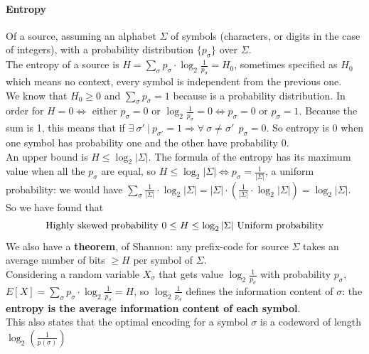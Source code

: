 \documentclass[10pt]{report}
\begin{document}
\paragraph{Entropy} Of a source, assuming an alphabet $\Sigma$ of symbols (characters, or digits in the case of integers), with a probability distribution $\{p_\sigma\}$ over $\Sigma$.\\
The entropy of a source is $H = \sum_\sigma p_\sigma\cdot\log_2 \frac{1}{p_\sigma} = H_0$, sometimes specified as $H_0$ which means no context, every symbol is independent from the previous one.\\
We know that $H_0 \geq 0$ and $\sum_\sigma p_\sigma = 1$ because is a probability distribution. In order for $H = 0 \Leftrightarrow$ either $p_\sigma = 0$ or $\log_2\frac{1}{p_\sigma} = 0 \Leftrightarrow p_\sigma = 0$ or $p_\sigma = 1$. Because the sum is 1, this means that if $\exists\:\sigma'\:|\:p_{\sigma'}=1 \Rightarrow \forall\:\sigma\neq\sigma'\:\:p_\sigma = 0$. So entropy is $0$ when one symbol has probability one and the other have probability $0$.\\
An upper bound is $H \leq \log_2 |\Sigma|$. The formula of the entropy has its maximum value when all the $p_\sigma$ are equal, so $H \leq \log_2 |\Sigma| \Leftrightarrow p_\sigma = \frac{1}{|\Sigma|}$, a uniform probability: we would have $\sum_\sigma \frac{1}{|\Sigma|}\cdot\log_2|\Sigma| = |\Sigma|\cdot\left(\frac{1}{|\Sigma|}\cdot\log_2|\Sigma|\right) = \log_2|\Sigma|$. So we have found that $$\hbox{Highly skewed probability }0 \leq H \leq \log_2 |\Sigma|\hbox{ Uniform probability}$$
We also have a \textbf{theorem}, of Shannon: any prefix-code for source $\Sigma$ takes an average number of bits $\geq H$ per symbol of $\Sigma$.\\
Considering a random variable $X_\sigma$ that gets value $\log_2 \frac{1}{p_\sigma}$ with probability $p_\sigma$, $E[X] = \sum_\sigma p_\sigma\cdot\log_2\frac{1}{p_\sigma} = H$, so $\log_2 \frac{1}{p_\sigma}$ defines the information content of $\sigma$: the \textbf{entropy is the average information content of each symbol}.\\
This also states that the optimal encoding for a symbol $\sigma$ is a codeword of length $\log_2\left(\frac{1}{p(\sigma)}\right)$
\end{document}
